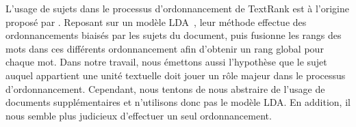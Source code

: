     L'usage de sujets dans le processus d'ordonnancement de TextRank est à
    l'origine proposé par . Reposant sur un
    modèle LDA~\cite[Latent Dirichlet Allocation]{blei2003lda}, leur méthode
    effectue des ordonnancements biaisés par les sujets du document, puis
    fusionne les rangs des mots dans ces différents ordonnancement afin
    d'obtenir un rang global pour chaque mot. Dans notre travail, nous émettons
    aussi l'hypothèse que le sujet auquel appartient une unité textuelle doit
    jouer un rôle majeur dans le processus d'ordonnancement. Cependant, nous
    tentons de nous abstraire de l'usage de documents supplémentaires et
    n'utilisons donc pas le modèle LDA. En addition, il nous semble plus
    judicieux d'effectuer un seul ordonnancement.

